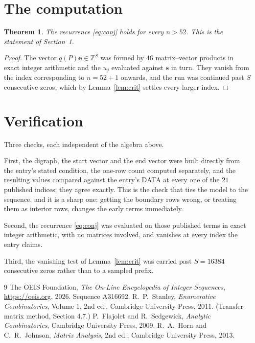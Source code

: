 \documentclass[11pt,a4paper]{article}
\theoremstyle{plain}
\newtheorem{theorem}{Theorem}
\theoremstyle{definition}
\begin{document}
\section{The computation}

\begin{theorem}
The recurrence \eqref{eq:conj} holds for every $n>52$. This is the statement of
Section~1.
\end{theorem}

\begin{proof}
The vector $q(P)\mathbf{e}\in\mathbb{Z}^{S}$ was formed by $46$ matrix--vector
products in exact integer arithmetic and the $u_j$ evaluated against $\mathbf{s}$ in turn.
They vanish from the index corresponding to $n=52+1$ onwards, and the run was continued
past $S$ consecutive zeros, which by Lemma~\ref{lem:crit} settles every larger index.
\end{proof}

\section{Verification}

Three checks, each independent of the algebra above.

First, the digraph, the start vector and the end vector were built directly from the
entry's stated condition, the one-row count computed separately, and the resulting values
compared against the entry's DATA at every one of the $21$ published indices; they
agree exactly. This is the check that ties the model to the sequence, and it is a sharp one:
getting the boundary rows wrong, or treating them as interior rows, changes the early terms
immediately.

Second, the recurrence \eqref{eq:conj} was evaluated on those published terms in exact
integer arithmetic, with no matrices involved, and vanishes at every index the entry claims.

Third, the vanishing test of Lemma~\ref{lem:crit} was carried past $S=16384$ consecutive
zeros rather than to a sampled prefix.

\begin{thebibliography}{9}
 The OEIS Foundation, \emph{The On-Line Encyclopedia of Integer
Sequences}, \url{https://oeis.org}, 2026. Sequence A316692.
 R.~P.~Stanley, \emph{Enumerative Combinatorics}, Volume 1, 2nd ed.,
Cambridge University Press, 2011. (Transfer-matrix method, Section 4.7.)
 P.~Flajolet and R.~Sedgewick, \emph{Analytic Combinatorics}, Cambridge
University Press, 2009.
 R.~A.~Horn and C.~R.~Johnson, \emph{Matrix Analysis}, 2nd ed., Cambridge
University Press, 2013.
\end{thebibliography}
\end{document}
